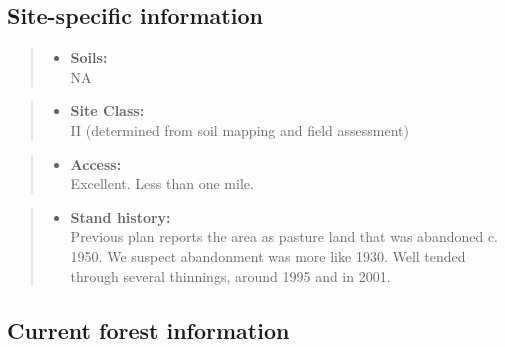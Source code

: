 \documentclass[]{tufte-handout}
\providecommand{\tightlist}{%
  \setlength{\itemsep}{0pt}\setlength{\parskip}{0pt}}
\begin{document}
\subsection{Site-specific
information}\label{site-specific-information-1}

\begin{quote}
\begin{itemize}
\tightlist
\item
  \textbf{Soils:}\\
  \indent\indent  NA
\end{itemize}
\end{quote}

\begin{quote}
\begin{itemize}
\tightlist
\item
  \textbf{Site Class:}\\
  \vspace{2pt} II (determined from soil mapping and field assessment)
\end{itemize}
\end{quote}

\begin{quote}
\begin{itemize}
\tightlist
\item
  \textbf{Access:}\\
  \vspace{2pt} Excellent. Less than one mile.
\end{itemize}
\end{quote}

\begin{quote}
\begin{itemize}
\tightlist
\item
  \textbf{Stand history:}\\
  \vspace{2pt} Previous plan reports the area as pasture land that was
  abandoned c. 1950. We suspect abandonment was more like 1930. Well
  tended through several thinnings, around 1995 and in 2001.
\end{itemize}
\end{quote}

\subsection{Current forest
information}\label{current-forest-information-1}
\end{document}

